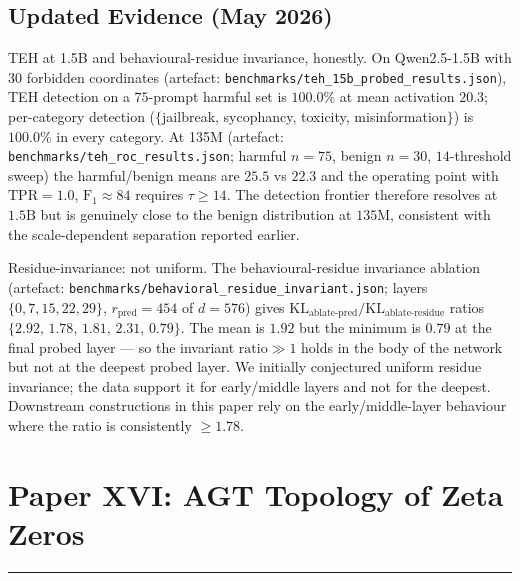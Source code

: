 \documentclass[11pt]{article}
\begin{document}
\subsection{Updated Evidence (May 2026)}
TEH at 1.5B and behavioural-residue invariance, honestly.
On Qwen2.5-1.5B with 30 forbidden coordinates (artefact:
\texttt{benchmarks/teh\_15b\_probed\_results.json}), TEH detection on a
$75$-prompt harmful set is $100.0\%$ at mean activation $20.3$;
per-category detection ($\{$jailbreak, sycophancy, toxicity,
misinformation$\}$) is $100.0\%$ in every category.  At 135M
(artefact: \texttt{benchmarks/teh\_roc\_results.json}; harmful $n{=}75$,
benign $n{=}30$, $14$-threshold sweep) the harmful/benign means are
$25.5$ vs $22.3$ and the operating point with $\mathrm{TPR}{=}1.0$,
$\mathrm{F}_1{\approx}84$ requires $\tau \ge 14$.  The detection
frontier therefore resolves at $1.5\mathrm{B}$ but is genuinely close
to the benign distribution at $135\mathrm{M}$, consistent with the
scale-dependent separation reported earlier.

Residue-invariance: not uniform.  The behavioural-residue
invariance ablation (artefact:
\texttt{benchmarks/behavioral\_residue\_invariant.json}; layers
$\{0,7,15,22,29\}$, $r_{\text{pred}}{=}454$ of $d{=}576$) gives
$\mathrm{KL}_{\text{ablate-pred}} / \mathrm{KL}_{\text{ablate-residue}}$
ratios $\{2.92,\,1.78,\,1.81,\,2.31,\,0.79\}$.  The mean is $1.92$ but the
minimum is $0.79$ at the final probed layer --- so the invariant
$\text{ratio}\gg 1$ holds in the body of the network but not at the
deepest probed layer.  We initially conjectured uniform residue
invariance; the data support it for early/middle layers and not for
the deepest.  Downstream constructions in this paper rely on the
early/middle-layer behaviour where the ratio is consistently $\ge 1.78$.

\newpage



\newpage
\section{Paper XVI: AGT Topology of Zeta Zeros}
\vspace{6pt}
\hrule
\vspace{12pt}
\end{document}
